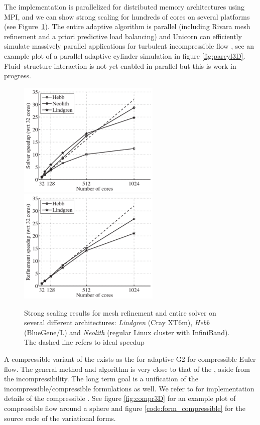 The  implementation is parallelized for distributed
memory architectures using MPI, and we can show strong scaling for
hundreds of cores on several platforms (see
Figure~\ref{fig:hoffman-2:sp}). The entire adaptive algorithm is
parallel (including Rivara mesh refinement and a priori predictive
load balancing) and Unicorn can efficiently simulate massively
parallel applications for turbulent incompressible
flow \citep{JanssonHoffmanJansson2010, Jansson2011}, see an example
plot of a parallel adaptive cylinder simulation in
figure \ref{fig:parcyl3D}. Fluid--structure interaction is not yet
enabled in parallel but this is work in progress.

\begin{figure}
\centering
\includegraphics[height=5.5cm]{chapters/hoffman-2/pdf/speedup_solve.pdf}
\includegraphics[height=5.5cm]{chapters/hoffman-2/pdf/speedup_unrivara.pdf}
\caption{\label{fig:hoffman-2:sp} Strong scaling results for mesh
refinement and entire solver on several different architectures:
\textit{Lindgren} (Cray XT6m), \textit{Hebb} (BlueGene/L) and
\textit{Neolith} (regular Linux cluster with InfiniBand). The dashed
line refers to ideal speedup}
\end{figure}

A compressible variant of the  exists as
the  for adaptive G2 for compressible Euler flow. The
general method and algorithm is very close to that of
the , aside from the incompressibility. The long term
goal is a unification of the incompressible/compressible formulations
as well. We refer to \citet{Nazarov2009} for implementation details of
the compressible
. See figure \ref{fig:compr3D} for an example plot of compressible flow around a
sphere and figure \ref{code:form_compressible} for the source code of
the variational forms.

